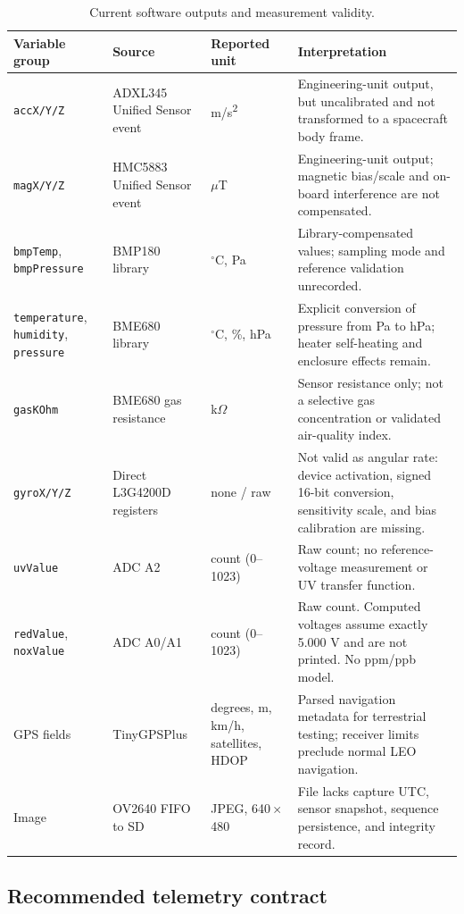 \documentclass[11pt,a4paper]{article}
\newcommand{\code}[1]{\texttt{#1}}
\begin{document}
\begin{table}[H]
\centering
\caption{Current software outputs and measurement validity.}
\label{tab:data}
\begin{tabularx}{\textwidth}{P{0.20\textwidth}P{0.21\textwidth}P{0.17\textwidth}Y}
\toprule
Variable group & Source & Reported unit & Interpretation\\
\midrule
\code{accX/Y/Z} & ADXL345 Unified Sensor event & m/s\textsuperscript{2} & Engineering-unit output, but uncalibrated and not transformed to a spacecraft body frame.\\
\code{magX/Y/Z} & HMC5883 Unified Sensor event & $\mu$T & Engineering-unit output; magnetic bias/scale and on-board interference are not compensated.\\
\code{bmpTemp}, \code{bmpPressure} & BMP180 library & $^\circ$C, Pa & Library-compensated values; sampling mode and reference validation unrecorded.\\
\code{temperature}, \code{humidity}, \code{pressure} & BME680 library & $^\circ$C, \%, hPa & Explicit conversion of pressure from Pa to hPa; heater self-heating and enclosure effects remain.\\
\code{gasKOhm} & BME680 gas resistance & k$\Omega$ & Sensor resistance only; not a selective gas concentration or validated air-quality index.\\
\code{gyroX/Y/Z} & Direct L3G4200D registers & none / raw & Not valid as angular rate: device activation, signed 16-bit conversion, sensitivity scale, and bias calibration are missing.\\
\code{uvValue} & ADC A2 & count (0--1023) & Raw count; no reference-voltage measurement or UV transfer function.\\
\code{redValue}, \code{noxValue} & ADC A0/A1 & count (0--1023) & Raw count. Computed voltages assume exactly 5.000 V and are not printed. No ppm/ppb model.\\
GPS fields & TinyGPSPlus & degrees, m, km/h, satellites, HDOP & Parsed navigation metadata for terrestrial testing; receiver limits preclude normal LEO navigation.\\
Image & OV2640 FIFO to SD & JPEG, 640\,$\times$\,480 & File lacks capture UTC, sensor snapshot, sequence persistence, and integrity record.\\
\bottomrule
\end{tabularx}
\end{table}

\subsection{Recommended telemetry contract}
\end{document}
